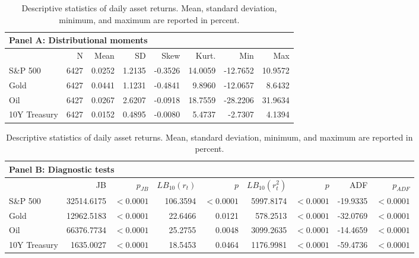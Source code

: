 \begin{table}[htbp]
\centering
\small
\setlength{\tabcolsep}{5pt}
\renewcommand{\arraystretch}{1.05}
\begin{tabular}{lrrrrrrr}
\toprule
\multicolumn{8}{l}{Panel A: Distributional moments} \\
\midrule
 & N & Mean & SD & Skew & Kurt. & Min & Max \\
\midrule
S\&P 500 & 6427 & 0.0252 & 1.2135 & -0.3526 & 14.0059 & -12.7652 & 10.9572 \\
Gold & 6427 & 0.0441 & 1.1231 & -0.4841 & 9.8960 & -12.0657 & 8.6432 \\
Oil & 6427 & 0.0267 & 2.6207 & -0.0918 & 18.7559 & -28.2206 & 31.9634 \\
10Y Treasury & 6427 & 0.0152 & 0.4895 & -0.0080 & 5.4737 & -2.7307 & 4.1394 \\
\bottomrule
\end{tabular}
\vspace{0.35em}

\begin{tabular}{lrrrrrrrr}
\toprule
\multicolumn{9}{l}{Panel B: Diagnostic tests} \\
\midrule
 & JB & $p_{JB}$ & $LB_{10}(r_t)$ & $p$ & $LB_{10}(r_t^2)$ & $p$ & ADF & $p_{ADF}$ \\
\midrule
S\&P 500 & 32514.6175 & $<0.0001$ & 106.3594 & $<0.0001$ & 5997.8174 & $<0.0001$ & -19.9335 & $<0.0001$ \\
Gold & 12962.5183 & $<0.0001$ & 22.6466 & 0.0121 & 578.2513 & $<0.0001$ & -32.0769 & $<0.0001$ \\
Oil & 66376.7734 & $<0.0001$ & 25.2755 & 0.0048 & 3099.2635 & $<0.0001$ & -14.4659 & $<0.0001$ \\
10Y Treasury & 1635.0027 & $<0.0001$ & 18.5453 & 0.0464 & 1176.9981 & $<0.0001$ & -59.4736 & $<0.0001$ \\
\bottomrule
\end{tabular}
\caption{Descriptive statistics of daily asset returns. Mean, standard deviation, minimum, and maximum are reported in percent.}
\label{tab:desc_stats}
\end{table}
